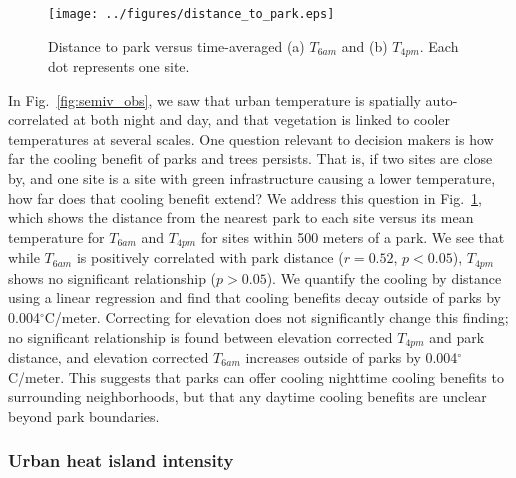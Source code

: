 \documentclass[draft,linenumbers]{agujournal}
\begin{document}
\begin{figure}
\centering
\texttt{[image: ../figures/distance\_to\_park.eps]}
\caption{Distance to park versus time-averaged (a) $T_{6am}$ and (b) $T_{4pm}$. Each dot represents one site.}
\label{fig:park_distance}
\end{figure}

In Fig.~\ref{fig:semiv_obs}, we saw that urban temperature is spatially auto-correlated at both night and day, and that vegetation is linked to cooler temperatures at several scales. One question relevant to decision makers is how far the cooling benefit of parks and trees persists. That is, if two sites are close by, and one site is a site with green infrastructure causing a lower temperature, how far does that cooling benefit extend? 
We address this question in Fig.~\ref{fig:park_distance}, which shows the distance from the nearest park to each site versus its mean temperature for $T_{6am}$ and $T_{4pm}$ for sites within 500 meters of a park. We see that while $T_{6am}$ is positively correlated with park distance ($r=0.52$, $p< 0.05$), $T_{4pm}$ shows no significant relationship ($p>0.05$).  We quantify the cooling by distance using a linear regression and find that cooling benefits decay outside of parks by 0.004$^\circ$C/meter. 
Correcting for elevation does not significantly change this finding; no significant relationship is found between elevation corrected $T_{4pm}$ and park distance, and elevation corrected $T_{6am}$ increases outside of parks by 0.004$^\circ$C/meter.  This suggests that parks can offer cooling nighttime cooling benefits to surrounding neighborhoods, but that any daytime cooling benefits are unclear beyond park boundaries. 

\subsubsection{Urban heat island intensity}
\end{document}
